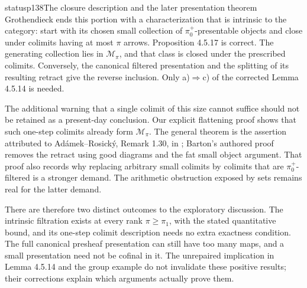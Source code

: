 \begin{dcomment}{status}{p138}{The closure description and the later presentation theorem}
Grothendieck ends this portion with a characterization that is intrinsic to the category: start with its chosen small collection of $\pi_0^+$-presentable objects and close under colimits having at most $\pi$ arrows. Proposition 4.5.17 is correct. The generating collection lies in $\mathcal M_\pi$, and that class is closed under the prescribed colimits. Conversely, the canonical filtered presentation and the splitting of its resulting retract give the reverse inclusion. Only a)$\Rightarrow$c) of the corrected Lemma 4.5.14 is needed.

The additional warning that a single colimit of this size cannot suffice should not be retained as a present-day conclusion. Our explicit flattening proof shows that such one-step colimits already form $\mathcal M_\pi$. The general theorem is the assertion attributed to Ad\'amek--Rosick\'y, Remark 1.30, in \citet{Barton2019Presentable}; Barton's authored proof removes the retract using good diagrams and the fat small object argument. That proof also records why replacing arbitrary small colimits by colimits that are $\pi_0^+$-filtered is a stronger demand. The arithmetic obstruction exposed by sets remains real for the latter demand.

There are therefore two distinct outcomes to the exploratory discussion. The intrinsic filtration exists at every rank $\pi\geq\pi_1$, with the stated quantitative bound, and its one-step colimit description needs no extra exactness condition. The full canonical presheaf presentation can still have too many maps, and a small presentation need not be cofinal in it. The unrepaired implication in Lemma 4.5.14 and the group example do not invalidate these positive results; their corrections explain which arguments actually prove them.
\end{dcomment}

